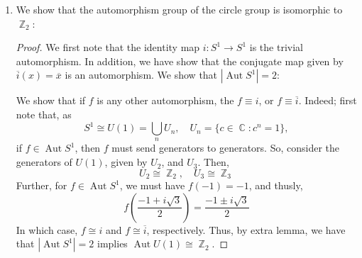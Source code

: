 \documentclass{book}
\DeclareMathOperator*{\C}{\mathbb{C}}
\DeclareMathOperator*{\Aut}{\text{Aut}}
\DeclareMathOperator*{\Z}{\mathbb{Z}}
\begin{document}
\begin{enumerate}[(1)]
    \item We show that the automorphism group of the circle group is isomorphic to $\Z_2$: 
        \begin{proof}   We first note that the identity map $i: S^1 \rightarrow S^1$ is the trivial automorphism. In addition, we have show that the conjugate map given by $\overline{i}(x) = \overline{x}$ is an automorphism. We show that $|\Aut S^1| = 2$: \par We show that if $f$ is any other automorphism, the $f \equiv i$, or $f \equiv \overline{i}$. Indeed; first note that, as 
            \[S^1 \cong U(1) = \bigcup_n U_n, \quad U_n = \{c \in \C: c^n = 1\},\]
            if $f \in \Aut S^1$, then $f$ must send generators to generators. So, consider the generators of $U(1)$, given by $U_2$, and $U_3$. Then, 
            \[U_2 \cong \Z_2, \quad U_3 \cong \Z_3\]
            Further, for $f \in \Aut S^1$, we must have $f(-1) = -1$, and thusly, 
            \[f( \frac{-1 + i \sqrt{3}}{2}) = \frac{-1 \pm i \sqrt{3}}{2}\]
            In which case, $f \cong i$ and $f \cong \overline{i}$, respectively. Thus, by extra lemma, we have that $|\Aut S^1| = 2$ implies $\Aut U(1) \cong \Z_2$.
        \end{proof}

\end{enumerate}
\end{document}
